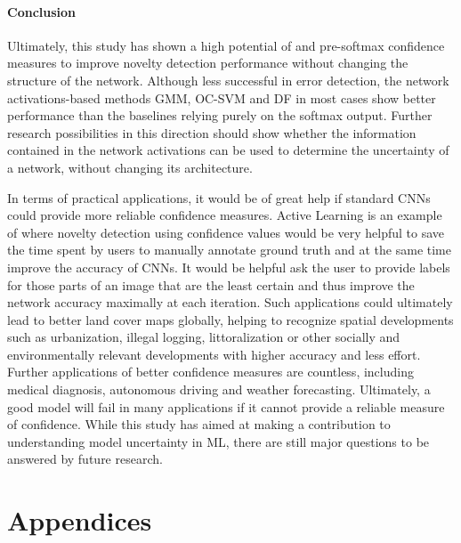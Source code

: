 \documentclass[10pt]{article}
\begin{document}
\paragraph{Conclusion} Ultimately, this study has shown a high potential of  and pre-softmax confidence measures to improve novelty detection performance without changing the structure of the network. Although less successful in error detection, the network activations-based methods \gls{GMM}, \gls{OC-SVM} and \gls{DF} in most cases show better performance than the baselines relying purely on the softmax output. Further research possibilities in this direction should show whether the information contained in the network activations can be used to determine the uncertainty of a network, without changing its architecture.

In terms of practical applications, it would be of great help if standard \glspl{CNN} could provide more reliable confidence measures. Active Learning is an example of where novelty detection using confidence values would be very helpful to save the time spent by users to manually annotate ground truth and at the same time improve the accuracy of \glspl{CNN}. It would be helpful ask the user to provide labels for those parts of an image that are the least certain and thus improve the network accuracy maximally at each iteration. Such applications could ultimately lead to better land cover maps globally, helping to recognize spatial developments such as urbanization, illegal logging, littoralization or other socially and environmentally relevant developments with higher accuracy and less effort. Further applications of better confidence measures are countless, including medical diagnosis, autonomous driving and weather forecasting. Ultimately, a good model will fail in many applications if it cannot provide a reliable measure of confidence. While this study has aimed at making a contribution to understanding model uncertainty in \gls{ML}, there are still major questions to be answered by future research.

\newpage
\printbibliography


\newpage
\renewcommand{\thesubsection}{\Alph{subsection}}
\pagebreak  

\section{Appendices}
\end{document}
